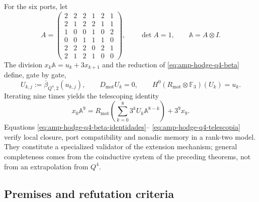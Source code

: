 For the six ports, let
\begin{equation}\label{eq:amp-hodge-q4-matriz}
 A=\begin{pmatrix}
 2&2&2&1&2&1\\
 2&1&2&2&1&1\\
 1&0&0&1&0&2\\
 0&0&1&1&1&0\\
 2&2&2&0&2&1\\
 2&1&2&1&0&0
 \end{pmatrix},
 \qquad \det A=1,
 \qquad \mathbb A=A\otimes I.
\end{equation}
The division \(x_k\mathbb A=u_k+3x_{k+1}\) and the reduction of
\eqref{eq:amp-hodge-q4-beta} define, gate by gate,
\begin{equation}\label{eq:amp-hodge-q4-uk}
 U_{k,j}:=\overline\beta_{Q^4,2}(u_{k,j}),
 \qquad
 D_{\mathrm{mot}}U_k=0,
 \qquad
 H^0(R_{\mathrm{mot}}\otimes\mathbb F_3)(U_k)=u_k.
\end{equation}
Iterating nine times yields the telescoping identity
\begin{equation}\label{eq:amp-hodge-q4-telescopia}
 x_0\mathbb A^9
 =R_{\mathrm{mot}}\!\left(
   \sum_{k=0}^{8}3^kU_k\mathbb A^{8-k}\right)+3^9x_9.
\end{equation}
Equations \eqref{eq:amp-hodge-q4-beta-identidades}--
\eqref{eq:amp-hodge-q4-telescopia} verify local closure, port compatibility
and nonadic memory in a rank-two model. They constitute a
specialized validator of the extension mechanism; general completeness
comes from the coinductive system of the preceding theorems, not from an
extrapolation from \(Q^4\).

\subsection{Premises and refutation criteria}
\label{subsec:amp-hodge-falsadores}

